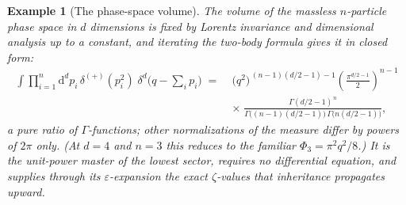 \documentclass[11pt]{article}
\newcommand{\eps}{\varepsilon}
\newcommand{\dd}{\mathrm{d}}
\newtheorem{example}[definition]{Example}
\begin{document}
\begin{example}[The phase-space volume]
\label{ex:volume}
The volume of the massless $n$-particle phase space in $d$
dimensions is fixed by Lorentz invariance and dimensional analysis
up to a constant, and iterating the two-body formula gives it in
closed form:
\begin{equation}
\begin{aligned}
  \int \prod_{i=1}^{n} \dd^d p_i\, \delta^{(+)}(p_i^2)\;
  \delta^d\Big(q - \sum_i p_i\Big)
  \;=\;&
  \big(q^2\big)^{\,(n-1)(d/2-1)-1}
  \left(\frac{\pi^{d/2-1}}{2}\right)^{\!n-1}\\[0.3ex]
  &\times\;
  \frac{\Gamma(d/2-1)^{\,n}}
       {\Gamma\big((n-1)(d/2-1)\big)\,
        \Gamma\big(n(d/2-1)\big)} ,
\end{aligned}
\end{equation}
a pure ratio of $\Gamma$-functions; other normalizations of the
measure differ by powers of $2\pi$ only.  (At $d = 4$ and $n = 3$
this reduces to the familiar $\Phi_3 = \pi^2 q^2/8$.)  It is the
unit-power master of the lowest sector, requires no differential
equation, and supplies through its $\eps$-expansion the exact
$\zeta$-values that inheritance propagates upward.
\end{example}
\end{document}
